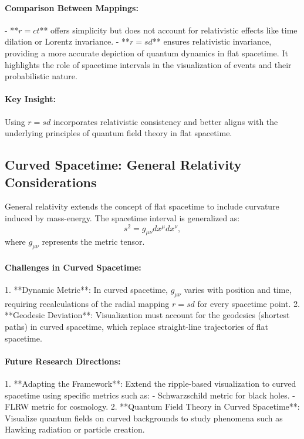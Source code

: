 \documentclass[12pt]{article}
\begin{document}
\paragraph{Comparison Between Mappings:}
- **\(r = ct\)** offers simplicity but does not account for relativistic effects like time dilation or Lorentz invariance.
- **\(r = sd\)** ensures relativistic invariance, providing a more accurate depiction of quantum dynamics in flat spacetime. It highlights the role of spacetime intervals in the visualization of events and their probabilistic nature.

\paragraph{Key Insight:}
Using \(r = sd\) incorporates relativistic consistency and better aligns with the underlying principles of quantum field theory in flat spacetime.

\subsection{Curved Spacetime: General Relativity Considerations}
General relativity extends the concept of flat spacetime to include curvature induced by mass-energy. The spacetime interval is generalized as:
\[
s^2 = g_{\mu\nu} dx^\mu dx^\nu,
\]
where \(g_{\mu\nu}\) represents the metric tensor.

\paragraph{Challenges in Curved Spacetime:}
1. **Dynamic Metric**: In curved spacetime, \(g_{\mu\nu}\) varies with position and time, requiring recalculations of the radial mapping \(r = sd\) for every spacetime point.
2. **Geodesic Deviation**: Visualization must account for the geodesics (shortest paths) in curved spacetime, which replace straight-line trajectories of flat spacetime.

\paragraph{Future Research Directions:}
1. **Adapting the Framework**: Extend the ripple-based visualization to curved spacetime using specific metrics such as:
   - Schwarzschild metric for black holes.
   - FLRW metric for cosmology.
2. **Quantum Field Theory in Curved Spacetime**: Visualize quantum fields on curved backgrounds to study phenomena such as Hawking radiation or particle creation.
\end{document}
